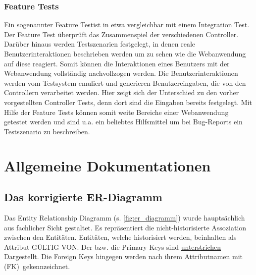 \documentclass[12pt,             %
               a4paper,          %
               listof=totoc,     %
               index=totoc,      %
               bibliography=totoc,%
               oneside,         %
               BCOR1cm,          %
               english   %
               ]{scrbook}
\begin{document}
\subsection{Feature Tests}
Ein sogenannter \glqq Feature Test\grqq ist in etwa vergleichbar mit einem \glqq Integration Test\grqq. Der Feature Test überprüft das Zusammenspiel der verschiedenen Controller. Darüber hinaus werden Testszenarien festgelegt, in denen reale Benutzerinteraktionen beschrieben werden um zu sehen wie die Webanwendung auf diese reagiert. Somit können die Interaktionen eines Benutzers mit der Webanwendung vollständig nachvollzogen werden. Die Benutzerinteraktionen werden vom Testsystem emuliert und generieren Benutzereingaben, die von den Controllern verarbeitet werden. Hier zeigt sich der Unterschied zu den vorher vorgestellten Controller Tests, denn dort sind die Eingaben bereits festgelegt. Mit Hilfe der Feature Tests können somit weite Bereiche einer Webanwendung getestet werden und sind u.a. ein beliebtes Hilfsmittel um bei Bug-Reports ein Testszenario zu beschreiben.

\clearpage
\chapter{Allgemeine Dokumentationen}
\section{Das korrigierte ER-Diagramm}

Das Entity Relationship Diagramm (s. \vref{fig:er_diagramm}) wurde hauptsächlich aus fachlicher Sicht gestaltet. Es repräsentiert die nicht-historisierte Assoziation zwischen den Entitäten. Entitäten, welche historisiert werden, beinhalten als Attribut \glqq GÜLTIG VON\grqq. Der bzw. die Primary Keys sind \underline{unterstrichen} Dargestellt. Die Foreign Keys hingegen werden nach ihrem Attributnamen mit \glqq (FK)\grqq\ gekennzeichnet. 
\end{document}
